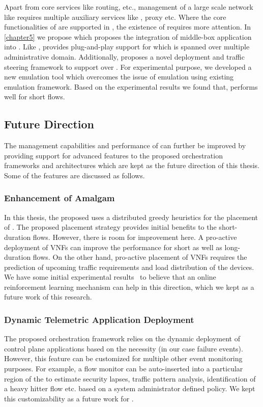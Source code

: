 Apart from core services like routing,  etc., management of a large scale network like  requires multiple auxiliary  services like , proxy etc. Where the core functionalities of  are supported in , the existence of  requires more attention. In \cref{chapter5} we propose  which proposes the integration of middle-box application into . Like ,  provides plug-and-play support for  which is spanned over multiple administrative domain. Additionally,  proposes a novel  deployment and traffic steering framework to support  over . For experimental purpose, we developed a new emulation tool  which overcomes the issue of  emulation using existing  emulation framework. Based on the experimental results we found that,  performs well for short flows.

\subsection{Future Direction}
The management capabilities and performance of  can further be improved by providing support for advanced features to the proposed orchestration frameworks and architectures which are kept as the future direction of this thesis. Some of the features are discussed as follows.
\subsubsection{Enhancement of Amalgam}
In this thesis, the proposed  uses a distributed greedy heuristics for the placement of . The proposed  placement strategy provides initial benefits to the short-duration flows. However, there is room for improvement here. A pro-active deployment of \acp{VNF} can improve the performance for short as well as long-duration flows. On the other hand, pro-active placement of \acp{VNF} requires the prediction of upcoming traffic requirements and load distribution of the devices. We have some initial experimental results~\cite{nath2019ptc:own} to believe that an online reinforcement learning mechanism can help in this direction, which we kept as a future work of this research.
\subsubsection{Dynamic Telemetric Application Deployment}
The proposed  orchestration framework relies on the dynamic deployment of control plane applications based on the necessity (in our case failure events). However, this feature can be customized for multiple other event monitoring purposes. For example, a flow monitor can be auto-inserted into a particular region of the  to estimate security lapses, traffic pattern analysis, identification of a heavy hitter flow etc. based on a system administrator defined policy. We kept this customizability as a future work for .
